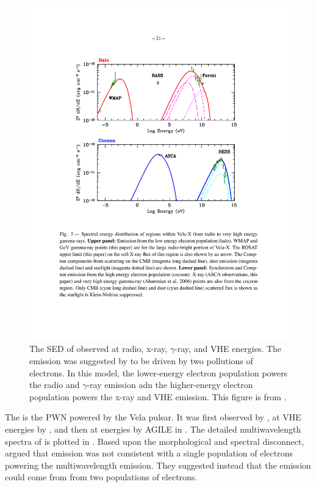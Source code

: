 \begin{figure}[htbp]
  \centering
    \includegraphics{chapters/introduction/figures/vela_x_sed_two_populations.pdf}
    \caption{The \ac{SED} of \velax observed at radio, x-ray,
      $\gamma$-ray, and \ac{VHE} energies. The emission was suggested
      by \citep{abdo_2010c_fermi-large} to be driven by two pollutions
      of electrons.  In this model, the lower-energy electron population
      powers the radio and $\gamma$-ray emission adn the higher-energy
      electron population powers the x-ray and \ac{VHE} emission.
      This figure is from \cite{abdo_2010c_fermi-large}.}
\end{figure}


The \velax is the \ac{PWN} powered by the Vela pulsar.  It was first
observed by \cite{rishbeth_1958a_radio-emission}, at \ac{VHE} energies
by \cite{aharonian_2006a_first-detection}, and then at \gev energies
by \ac{AGILE} in \cite{pellizzoni_2010a_detection-gamma-ray}.
The detailed multiwavelength spectra of \velax is plotted in
.  Based upon the morphological and
spectral disconnect, \citep{abdo_2010c_fermi-large} argued that emission
was not consistent with a single population of electrons powering the
multiwavelength emission. They suggested instead that the emission could
come from from two populations of electrons.

